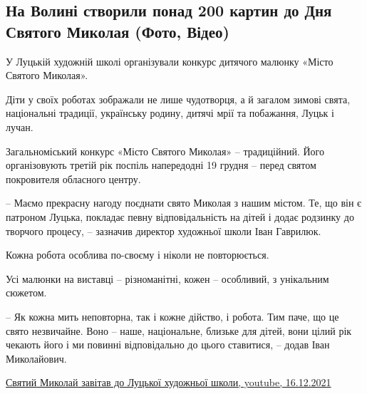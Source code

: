  
 
 
 
 
\subsection{На Волині створили понад 200 картин до Дня Святого Миколая (Фото, Відео)}
\label{sec:16_12_2021.stz.news.ua.volyn.1.sv_nikolaj_kartiny}

\begin{multicols}{2} %
\setlength{\parindent}{0pt}


У Луцькій художній школі організували конкурс дитячого малюнку «Місто Святого
Миколая».

Діти у своїх роботах зображали не лише чудотворця, а й загалом зимові свята,
національні традиції, українську родину, дитячі мрії та побажання, Луцьк і
лучан.

Загальноміський конкурс «Місто Святого Миколая» – традиційний. Його
організовують третій рік поспіль напередодні 19 грудня – перед святом
покровителя обласного центру. 

– Маємо прекрасну нагоду поєднати свято Миколая з нашим містом. Те, що він є
патроном Луцька, покладає певну відповідальність на дітей і додає родзинку до
творчого процесу, – зазначив директор художньої школи Іван Гаврилюк. 

\begin{zznagolos}
Кожна робота особлива по-своєму  і ніколи не повторюється.	
\end{zznagolos}

Усі малюнки на виставці – різноманітні, кожен – особливий, з унікальним
сюжетом.

– Як кожна мить неповторна, так і кожне дійство, і робота. Тим паче, що це
свято незвичайне. Воно – наше, національне, близьке для дітей, вони цілий рік
чекають його і ми повинні відповідально до цього ставитися, – додав Іван
Миколайович.

\end{multicols} %

\href{https://www.youtube.com/watch?v=-sNTIiYoIRg}{%
Святий Миколай завітав до Луцької художньої школи, youtube, 16.12.2021%
}

